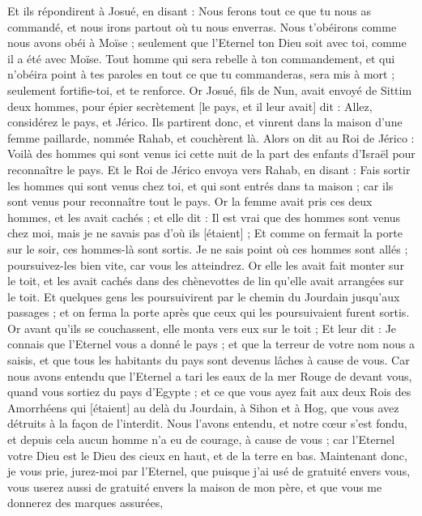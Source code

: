 \begin{multicols}{2}
Et ils répondirent à Josué, en disant : Nous ferons tout ce que tu nous as commandé, et nous irons partout où tu nous enverras.
Nous t'obéirons comme nous avons obéi à Moïse ; seulement que l'Eternel ton Dieu soit avec toi, comme il a été avec Moïse.
Tout homme qui sera rebelle à ton commandement, et qui n'obéira point à tes paroles en tout ce que tu commanderas, sera mis à mort ; seulement fortifie-toi, et te renforce.
\VerseOne{}Or Josué, fils de Nun, avait envoyé de Sittim deux hommes, pour épier secrètement [le pays, et il leur avait] dit : Allez, considérez le pays, et Jérico. Ils partirent donc, et vinrent dans la maison d'une femme paillarde, nommée Rahab, et couchèrent là.
Alors on dit au Roi de Jérico : Voilà des hommes qui sont venus ici cette nuit de la part des enfants d'Israël pour reconnaître le pays.
Et le Roi de Jérico envoya vers Rahab, en disant : Fais sortir les hommes qui sont venus chez toi, et qui sont entrés dans ta maison ; car ils sont venus pour reconnaître tout le pays.
Or la femme avait pris ces deux hommes, et les avait cachés ; et elle dit : Il est vrai que des hommes sont venus chez moi, mais je ne savais pas d'où ils [étaient] ;
Et comme on fermait la porte sur le soir, ces hommes-là sont sortis. Je ne sais point où ces hommes sont allés ; poursuivez-les bien vite, car vous les atteindrez.
Or elle les avait fait monter sur le toit, et les avait cachés dans des chènevottes de lin qu'elle avait arrangées sur le toit.
Et quelques gens les poursuivirent par le chemin du Jourdain jusqu'aux passages ; et on ferma la porte après que ceux qui les poursuivaient furent sortis.
Or avant qu'ils se couchassent, elle monta vers eux sur le toit ;
Et leur dit : Je connais que l'Eternel vous a donné le pays ; et que la terreur de votre nom nous a saisis, et que tous les habitants du pays sont devenus lâches à cause de vous.
Car nous avons entendu que l'Eternel a tari les eaux de la mer Rouge de devant vous, quand vous sortiez du pays d'Egypte ; et ce que vous ayez fait aux deux Rois des Amorrhéens qui [étaient] au delà du Jourdain, à Sihon et à Hog, que vous avez détruits à la façon de l'interdit.
Nous l'avons entendu, et notre cœur s'est fondu, et depuis cela aucun homme n'a eu de courage, à cause de vous ; car l'Eternel votre Dieu est le Dieu des cieux en haut, et de la terre en bas.
Maintenant donc, je vous prie, jurez-moi par l'Eternel, que puisque j'ai usé de gratuité envers vous, vous userez aussi de gratuité envers la maison de mon père, et que vous me donnerez des marques assurées,

\end{multicols}
